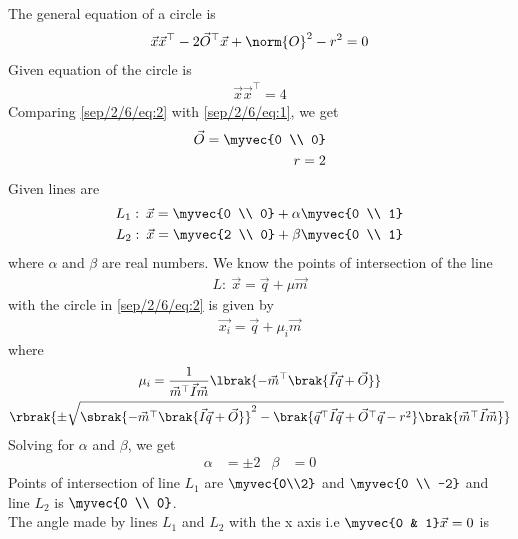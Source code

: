 The general equation of a circle is 
\begin{align}
\label{sep/2/6/eq:1}
\Vec{x}\Vec{x}^\top - 2 \Vec{O}^\top \Vec{x} + \norm{O}^{2}-r^2=0
\end{align}
Given equation of the circle is
\begin{align}
\label{sep/2/6/eq:2}
\Vec{x}\Vec{x}^\top = 4
\end{align}
Comparing \eqref{sep/2/6/eq:2} with \eqref{sep/2/6/eq:1}, we get
\begin{align}
\label{sep/2/6/eq:3}
\Vec{O}=\myvec{0 \\ 0}\\
\label{sep/2/6/eq:4}
r=2
\end{align}
Given lines are
\begin{align}
\label{sep/2/6/eq:5}
L_{1}: \: \Vec{x}=\myvec{0 \\ 0} + \alpha \myvec{0 \\ 1} \\
\label{sep/2/6/eq:6}
L_{2}: \: \Vec{x}=\myvec{2 \\ 0} + \beta \myvec{0 \\ 1}
\end{align}
where $\alpha$ and $\beta$ are real numbers.
We know the points of intersection of the line
\begin{align}
\label{sep/2/6/eq:7}
L: \: \Vec{x}=\Vec{q}+\mu\Vec{m}
\end{align}
with the circle in \eqref{sep/2/6/eq:2} is given by 
\begin{align}
\label{sep/2/6/eq:8}
\Vec{x_{i}}=\Vec{q}+\mu_{i}\Vec{m}
\end{align}
where 
\begin{multline}
\mu_{i} = \frac{1}{\Vec{m}^\top \Vec{I}\Vec{m}}\lbrak{-\Vec{m}^\top\brak{\Vec{I}\Vec{q}+\Vec{O}}}\\
\rbrak{\pm \sqrt{\sbrak{-\Vec{m}^\top\brak{\Vec{I}\Vec{q}+\Vec{O}}}^2-\brak{\Vec{q}^\top\Vec{I}\Vec{q}+\Vec{O}^\top\Vec{q}-r^2}\brak{\Vec{m}^\top \Vec{I}\Vec{m}}}}
\end{multline}
Solving for $\alpha$ and $\beta$, we get
\begin{align}
\label{sep/2/6/eq:10}
\alpha&=\pm 2 & \beta&=0
\end{align}
Points of intersection of line $L_{1}$ are $\myvec{0\\2}$ and $\myvec{0 \\ -2}$ and line $L_{2}$ is $\myvec{0 \\ 0}$.\\
The angle made by lines $L_{1}$ and $L_{2}$ with the x axis i.e $\myvec{0 & 1}\Vec{x}=0$ is
